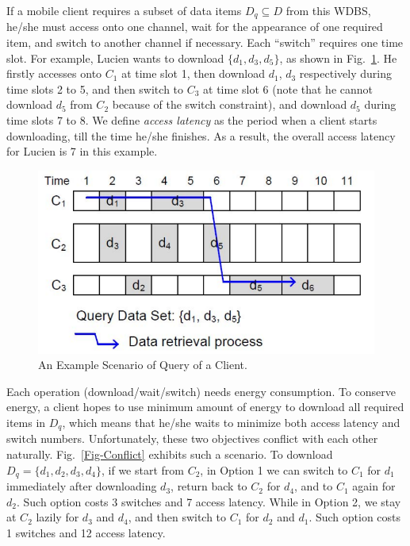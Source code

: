 \documentclass[12pt,a4paper]{article}
\theoremstyle{definition}
\begin{document}
\begin{enumerate}
If a mobile client requires a subset of data items $D_q \subseteq D$ from this WDBS, he/she must access onto one channel, wait for the appearance of one required item, and switch to another channel if necessary. Each ``switch'' requires one time slot. For example, Lucien wants to download $\{d_1, d_3, d_5\}$, as shown in Fig.~\ref{Fig-Access}. He firstly accesses onto $C_1$ at time slot 1, then download $d_1$, $d_3$ respectively during time slots 2 to 5, and then switch to $C_3$ at time slot 6 (note that he cannot download $d_5$ from $C_2$ because of the switch constraint), and download $d_5$ during time slots 7 to 8. We define \emph{access latency} as the period when a client starts downloading, till the time he/she finishes. As a result, the overall access latency for Lucien is 7 in this example.

\begin{figure}[!htbp]
	\centering
	\includegraphics[scale= 0.5]{Fig-Access.pdf}
	\caption{An Example Scenario of Query of a Client.} \label{Fig-Access}
\end{figure}

Each operation (download/wait/switch) needs energy consumption. To conserve energy, a client hopes to use minimum amount of energy to download all required items in $D_q$, which means that he/she waits to minimize both access latency and switch numbers. Unfortunately, these two objectives conflict with each other naturally. Fig.~\ref{Fig-Conflict} exhibits such a scenario. To download $D_q=\{d_1, d_2, d_3, d_4\}$, if we start from $C_2$, in Option 1 we can switch to $C_1$ for $d_1$ immediately after downloading $d_3$, return back to $C_2$ for $d_4$, and to $C_1$ again for $d_2$. Such option costs 3 switches and 7 access latency. While in Option 2, we stay at $C_2$ lazily for $d_3$ and $d_4$, and then switch to $C_1$ for $d_2$ and $d_1$. Such option costs 1 switches and 12 access latency.



\end{enumerate}
\end{document}
